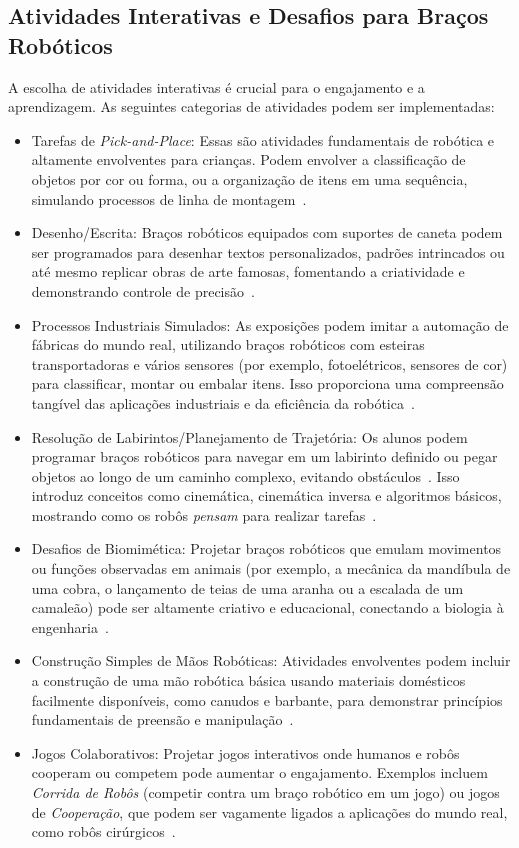 \documentclass[%
  a4paper,%
  12pt,%
  fleqn,%
  english,%
  brazilian,%
]{article}
\begin{document}
\subsection{Atividades Interativas e Desafios para Braços Robóticos}
A escolha de atividades interativas é crucial para o engajamento e a aprendizagem. As seguintes categorias de atividades podem ser implementadas:
	\begin{itemize}
		\item Tarefas de \emph{Pick-and-Place}: Essas são atividades fundamentais de robótica e altamente envolventes para crianças. Podem envolver a classificação de objetos por cor ou forma, ou a organização de itens em uma sequência, simulando processos de linha de montagem~\cite{robotlabDobotClassroomPack2025}.
		\item Desenho/Escrita: Braços robóticos equipados com suportes de caneta podem ser programados para desenhar textos personalizados, padrões intrincados ou até mesmo replicar obras de arte famosas, fomentando a criatividade e demonstrando controle de precisão~\cite{centrePointRoboticsGames2025}.
		\item Processos Industriais Simulados: As exposições podem imitar a automação de fábricas do mundo real, utilizando braços robóticos com esteiras transportadoras e vários sensores (por exemplo, fotoelétricos, sensores de cor) para classificar, montar ou embalar itens. Isso proporciona uma compreensão tangível das aplicações industriais e da eficiência da robótica~\cite{robotlabDobotClassroomPack2025}.
		\item Resolução de Labirintos/Planejamento de Trajetória: Os alunos podem programar braços robóticos para navegar em um labirinto definido ou pegar objetos ao longo de um caminho complexo, evitando obstáculos~\cite{rancholabsUltimateGuide2025}. Isso introduz conceitos como cinemática, cinemática inversa e algoritmos básicos, mostrando como os robôs \emph{pensam} para realizar tarefas~\cite{chang2025ConstructedResponse}.
		\item Desafios de Biomimética: Projetar braços robóticos que emulam movimentos ou funções observadas em animais (por exemplo, a mecânica da mandíbula de uma cobra, o lançamento de teias de uma aranha ou a escalada de um camaleão) pode ser altamente criativo e educacional, conectando a biologia à engenharia~\cite{ross2024BeyondExhibits}. 
		\item Construção Simples de Mãos Robóticas: Atividades envolventes podem incluir a construção de uma mão robótica básica usando materiais domésticos facilmente disponíveis, como canudos e barbante, para demonstrar princípios fundamentais de preensão e manipulação~\cite{scienceBuddiesRoboticsProjects2025}.
		\item Jogos Colaborativos: Projetar jogos interativos onde humanos e robôs cooperam ou competem pode aumentar o engajamento. Exemplos incluem \emph{Corrida de Robôs} (competir contra um braço robótico em um jogo) ou jogos de \emph{Cooperação}, que podem ser vagamente ligados a aplicações do mundo real, como robôs cirúrgicos~\cite{centrePointRoboticsGames2025}.
	\end{itemize}
\end{document}
